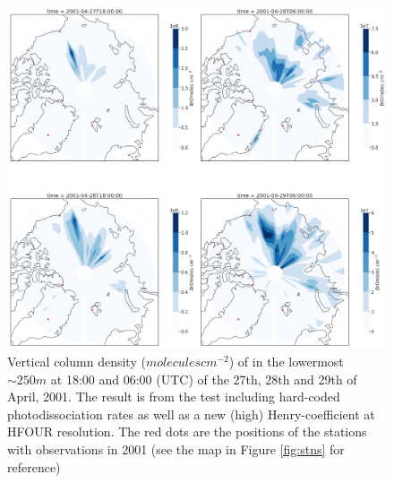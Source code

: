 \begin{figure}[h]
    \centering
    \includegraphics[width=\linewidth]{Chapter6_Results/images/polarBrO_HFOUR_step3.png}
    \caption{Vertical column density ($molecules cm^{-2}$) of  in the lowermost $\sim 250 m$ at 18:00 and 06:00 (UTC) of the 27th, 28th and 29th of April, 2001. The result is from the test including hard-coded photodissociation rates as well as a new (high) Henry-coefficient at HFOUR resolution. The red dots are the positions of the stations with observations in 2001 (see the map in Figure \ref{fig:stns} for reference)}
    \label{fig:polarBrO_HFOUR_step3}
\end{figure}